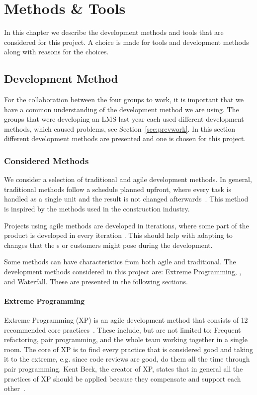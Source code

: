 \chapter{Methods \& Tools}
In this chapter we describe the development methods and tools that are considered for this project.
A choice is made for tools and development methods along with reasons for the choices.

\section{Development Method}
\label{sec:devMethod}
For the collaboration between the four groups to work, it is important that we have a common understanding of the development method we are using.
The groups that were developing an LMS last year each used different development methods, which caused problems, see Section~\ref{sec:prevwork}.
In this section different development methods are presented and one is chosen for this project.

\subsection{Considered Methods}
We consider a selection of traditional and agile development methods.
In general, traditional methods follow a schedule planned upfront, where every task is handled as a single unit and the result is not changed afterwards~\cite[sec.~2.7]{Poppendieck00}.
This method is inspired by the methods used in the construction industry.

Projects using agile methods are developed in iterations, where some part of the product is developed in every iteration \cite[p.~25]{Larman04}.
This should help with adapting to changes that the \euser{}s or customers might pose during the development.

Some methods can have characteristics from both agile and traditional.
The development methods considered in this project are: Extreme Programming, \scrum{}, and Waterfall.
These are presented in the following sections.

\subsubsection{Extreme Programming}
Extreme Programming (XP) is an agile development method that consists of 12 recommended core practices~\cite[p.~137]{Larman04}.
These include, but are not limited to: Frequent refactoring, pair programming, and the whole team working together in a single room.
The core of XP is to find every practice that is considered good and taking it to the extreme, e.g. since code reviews are good, do them all the time through pair programming.
Kent Beck, the creator of XP, states that in general all the practices of XP should be applied because they compensate and support each other~\cite[p.~156-157]{Larman04}.

